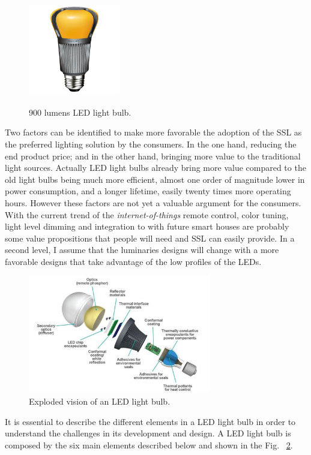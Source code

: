 \begin{figure}[!h]
\centering
\includegraphics[width=4cm]{./0_intro/img/enduraled-12w.jpg}
\label{fig:l_prize}
\caption{900 lumens LED light bulb.}
\end{figure}

Two factors can be identified to make more favorable the adoption of the SSL as the preferred lighting solution by the consumers. In the one hand, reducing the end product price; and in the other hand, bringing more value to the traditional light sources. Actually LED light bulbs already bring more value compared to the old light bulbs being much more efficient, almost one order of magnitude lower in power consumption, and a longer lifetime, easily twenty times more operating hours. However these factors are not yet a valuable argument for the consumers. With the current trend of the \emph{internet-of-things} remote control, color tuning, light level dimming and integration to with future smart houses are probably some value propositions that people will need and SSL can easily provide. In a second level, I assume that the luminaries designs will change with a more favorable designs that take advantage of the low profiles of the LEDs.

 \begin{figure}[!h]
\centering
\includegraphics[width=8cm]{./0_intro/img/exploded_bulb_2.jpg}
\caption{Exploded vision of an LED light bulb.}
\label{fig:exploded_bulb}
\end{figure}

It is essential to describe the different elements in a LED light bulb in order to understand the challenges in its development and  design. A LED light bulb is composed by the six main elements described below and shown in  the Fig. ~\ref{fig:exploded_bulb}.

